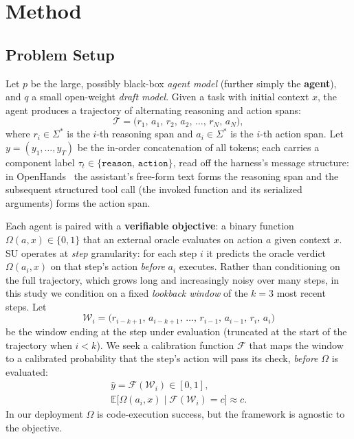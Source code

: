 \documentclass[11pt]{article}
\begin{document}
\section{Method}
\label{sec:method}

\subsection{Problem Setup}
\label{sec:setup}

Let $p$ be the large, possibly black-box \emph{agent model} (further simply the \textbf{agent}),
and $q$ a small open-weight \emph{draft model}. Given a task with initial
context $x$, the agent produces a trajectory of alternating reasoning and
action spans:
\begin{equation*}
  \mathcal{T} = \bigl(r_1,\, a_1,\, r_2,\, a_2,\, \ldots,\, r_N,\, a_N\bigr),
\end{equation*}
where $r_i \in \Sigma^*$ is the $i$-th reasoning span and $a_i \in \Sigma^*$ is
the $i$-th action span. Let $y = (y_1, \ldots, y_T)$ be the in-order
concatenation of all tokens; each carries a component label
$\tau_t \in \{\texttt{reason},\, \texttt{action}\}$, read off the harness's message structure: in OpenHands~\citep{wang2025openhands} the assistant's free-form
text forms the reasoning span and the subsequent structured tool call (the
invoked function and its serialized arguments) forms the action span.

Each agent is paired with a \textbf{verifiable objective}: a binary function
$\Omega(a, x) \in \{0, 1\}$ that an external oracle evaluates on action $a$
given context $x$. SU operates at \emph{step} granularity: for each step $i$ it
predicts the oracle verdict $\Omega(a_i, x)$ on that step's action
\emph{before} $a_i$ executes. Rather than conditioning on the full
trajectory, which grows long and increasingly noisy over many steps, in this study we
condition on a fixed \emph{lookback window} of the $k=3$ most recent steps. Let
\begin{equation*}
  \mathcal{W}_i = \bigl(r_{i-k+1},\, a_{i-k+1},\, \ldots,\, r_{i-1},\, a_{i-1},\, r_i,\, a_i\bigr)
  \label{eq:window}
\end{equation*}
be the window ending at the step under evaluation (truncated at the start of
the trajectory when $i < k$). We seek a calibration function $\mathcal{F}$ that
maps the window to a calibrated probability that the step's action will pass its
check, \emph{before} $\Omega$ is evaluated:
\begin{gather*}
  \hat{y} = \mathcal{F}(\mathcal{W}_i) \in [0, 1], \\
  \mathbb{E}\bigl[\Omega(a_i,x) \mid \mathcal{F}(\mathcal{W}_i) = c\bigr] \approx c.
\end{gather*}
In our
deployment $\Omega$ is code-execution success, but the framework is agnostic to
the objective.
\end{document}

